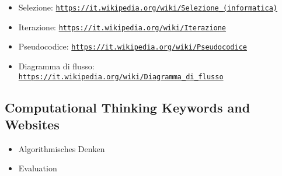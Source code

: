 \documentclass[a4paper,11pt]{report}
\newcommand{\BrochureUrlText}[1]{\texttt{#1}}
\begin{document}
\begin{itemize}
  \item Selezione: \href{https://it.wikipedia.org/wiki/Selezione_(informatica)}{\BrochureUrlText{https://it.wikipedia.org/wiki/Selezione\_(informatica)}}
  \item Iterazione: \href{https://it.wikipedia.org/wiki/Iterazione}{\BrochureUrlText{https://it.wikipedia.org/wiki/Iterazione}}
  \item Pseudocodice: \href{https://it.wikipedia.org/wiki/Pseudocodice}{\BrochureUrlText{https://it.wikipedia.org/wiki/Pseudocodice}}
  \item Diagramma di flusso: \href{https://it.wikipedia.org/wiki/Diagramma_di_flusso}{\BrochureUrlText{https://it.wikipedia.org/wiki/Diagramma\_di\_flusso}}
\end{itemize}


\subsection*{Computational Thinking Keywords and Websites}

\begin{itemize}
  \item Algorithmisches Denken
  \item Evaluation
\end{itemize}
\end{document}
